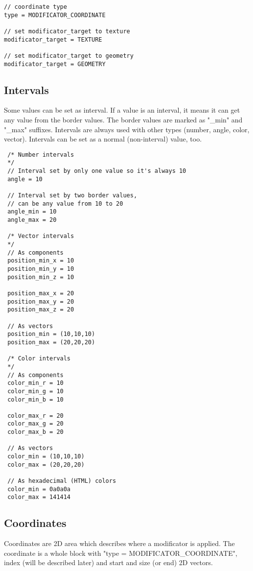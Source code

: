 \documentclass[11pt]{article}
\begin{document}
\begin{verbatim}
// coordinate type
type = MODIFICATOR_COORDINATE

// set modificator_target to texture
modificator_target = TEXTURE

// set modificator_target to geometry
modificator_target = GEOMETRY
\end{verbatim}

\subsection{Intervals}

Some values can be set as interval. If a value is an interval,
it means it can get any value from the border values. The border values
are marked as "\_min" and "\_max" suffixes. Intervals are always used
with other types (number, angle, color, vector). Intervals can be set 
as a normal (non-interval) value, too.

\begin{verbatim}
 /* Number intervals
 */
 // Interval set by only one value so it's always 10
 angle = 10

 // Interval set by two border values, 
 // can be any value from 10 to 20
 angle_min = 10
 angle_max = 20 
 
 /* Vector intervals
 */ 
 // As components
 position_min_x = 10
 position_min_y = 10
 position_min_z = 10
 
 position_max_x = 20
 position_max_y = 20
 position_max_z = 20

 // As vectors
 position_min = (10,10,10)
 position_max = (20,20,20)

 /* Color intervals
 */
 // As components
 color_min_r = 10
 color_min_g = 10
 color_min_b = 10
 
 color_max_r = 20
 color_max_g = 20
 color_max_b = 20
 
 // As vectors
 color_min = (10,10,10)
 color_max = (20,20,20)
 
 // As hexadecimal (HTML) colors
 color_min = 0a0a0a
 color_max = 141414

\end{verbatim}

\subsection{Coordinates}

Coordinates are 2D area which describes 
where a modificator is applied.  The coordinate is a whole 
block with "type = MODIFICATOR\_COORDINATE", index (will be described later)
and start and size (or end) 2D vectors.
\end{document}
